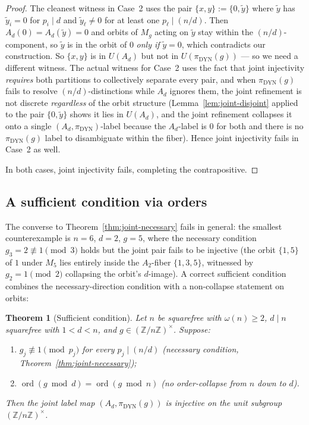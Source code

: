 \documentclass[11pt,reqno]{amsart}
\theoremstyle{plain}
\newtheorem{theorem}{Theorem}[section]
\theoremstyle{definition}
\theoremstyle{remark}
\DeclareMathOperator{\ord}{ord}
\DeclareMathOperator{\dyn}{DYN}
\newcommand{\Z}{\mathbb{Z}}
\begin{document}
\begin{proof}
The cleanest witness in Case~2 uses the pair $\{x, y\} := \{0,
\widetilde{y}\}$ where $\widetilde{y}$ has $\widetilde{y}_{i} = 0$
for $p_{i} \mid d$ and $\widetilde{y}_{\ell} \ne 0$ for at least one
$p_{\ell} \mid (n/d)$. Then $A_{d}(0) = A_{d}(\widetilde{y}) = 0$
and orbits of $M_{g}$ acting on $\widetilde{y}$ stay within the
$(n/d)$-component, so $\widetilde{y}$ is in the orbit of $0$ \emph{only
if} $\widetilde{y} = 0$, which contradicts our construction. So
$\{x, y\}$ is in $U(A_{d})$ but not in $U(\pi_{\dyn}(g))$ --- so we
need a different witness. The actual witness for Case~2 uses the
fact that joint injectivity \emph{requires} both partitions to
collectively separate every pair, and when $\pi_{\dyn}(g)$ fails to
resolve $(n/d)$-distinctions while $A_{d}$ ignores them, the joint
refinement is not discrete \emph{regardless} of the orbit structure
(Lemma~\ref{lem:joint-disjoint} applied to the pair $\{0,
\widetilde{y}\}$ shows it lies in $U(A_{d})$, and the joint
refinement collapses it onto a single $(A_{d}, \pi_{\dyn})$-label
because the $A_{d}$-label is $0$ for both and there is no $\pi_{\dyn}(g)$
label to disambiguate within the fiber). Hence joint injectivity
fails in Case~2 as well.

In both cases, joint injectivity fails, completing the contrapositive.
\end{proof}

\subsection{A sufficient condition via orders}

The converse to Theorem~\ref{thm:joint-necessary} fails in general:
the smallest counterexample is $n = 6$, $d = 2$, $g = 5$, where the
necessary condition $g_{3} = 2 \not\equiv 1 \pmod{3}$ holds but the
joint pair fails to be injective (the orbit $\{1, 5\}$ of $1$ under
$M_{5}$ lies entirely inside the $A_{2}$-fiber $\{1, 3, 5\}$,
witnessed by $g_{2} = 1 \pmod{2}$ collapsing the orbit's $d$-image).
A correct sufficient condition combines the necessary-direction
condition with a non-collapse statement on orbits:

\begin{theorem}[Sufficient condition]\label{thm:joint-sufficient}
Let $n$ be squarefree with $\omega(n) \ge 2$, $d \mid n$ squarefree
with $1 < d < n$, and $g \in (\Z/n\Z)^{\times}$. Suppose:
\begin{enumerate}[label={\upshape(\roman*)}]
\item $g_{j} \not\equiv 1 \pmod{p_{j}}$ for every $p_{j} \mid (n/d)$
\quad (necessary condition, Theorem~\ref{thm:joint-necessary});
\item $\ord(g \bmod d) = \ord(g \bmod n)$
\quad (no order-collapse from $n$ down to $d$).
\end{enumerate}
Then the joint label map $(A_{d}, \pi_{\dyn}(g))$ is injective on
the unit subgroup $(\Z/n\Z)^{\times}$.
\end{theorem}
\end{document}
